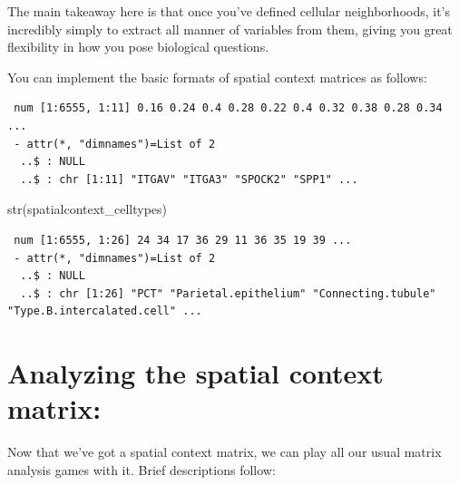 \documentclass[
  letterpaper,
  DIV=11,
  numbers=noendperiod]{scrartcl}
\newenvironment{Shaded}{\begin{snugshade}}{\end{snugshade}}
\newcommand{\CommentTok}[1]{\textcolor[rgb]{0.37,0.37,0.37}{#1}}
\newcommand{\FunctionTok}[1]{\textcolor[rgb]{0.28,0.35,0.67}{#1}}
\newcommand{\NormalTok}[1]{\textcolor[rgb]{0.00,0.23,0.31}{#1}}
\newcommand{\OtherTok}[1]{\textcolor[rgb]{0.00,0.23,0.31}{#1}}
\newcommand{\SpecialCharTok}[1]{\textcolor[rgb]{0.37,0.37,0.37}{#1}}
\begin{document}
The main takeaway here is that once you've defined cellular
neighborhoods, it's incredibly simply to extract all manner of variables
from them, giving you great flexibility in how you pose biological
questions.

You can implement the basic formats of spatial context matrices as
follows:

\begin{Shaded}
\end{Shaded}

\begin{verbatim}
 num [1:6555, 1:11] 0.16 0.24 0.4 0.28 0.22 0.4 0.32 0.38 0.28 0.34 ...
 - attr(*, "dimnames")=List of 2
  ..$ : NULL
  ..$ : chr [1:11] "ITGAV" "ITGA3" "SPOCK2" "SPP1" ...
\end{verbatim}

\begin{Shaded}
\begin{Highlighting}[]
\FunctionTok{str}\NormalTok{(spatialcontext\_celltypes)}
\end{Highlighting}
\end{Shaded}

\begin{verbatim}
 num [1:6555, 1:26] 24 34 17 36 29 11 36 35 19 39 ...
 - attr(*, "dimnames")=List of 2
  ..$ : NULL
  ..$ : chr [1:26] "PCT" "Parietal.epithelium" "Connecting.tubule" "Type.B.intercalated.cell" ...
\end{verbatim}

\hypertarget{analyzing-the-spatial-context-matrix}{%
\section{Analyzing the spatial context
matrix:}\label{analyzing-the-spatial-context-matrix}}

Now that we've got a spatial context matrix, we can play all our usual
matrix analysis games with it. Brief descriptions follow:
\end{document}
